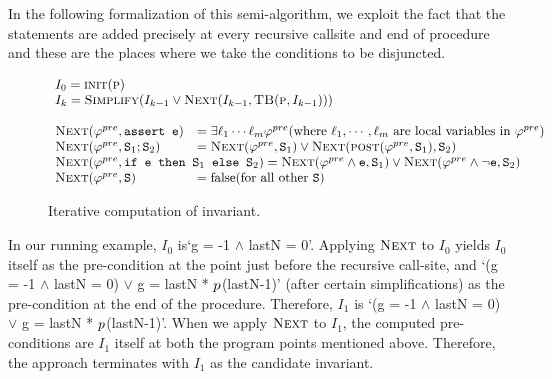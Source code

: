In the following formalization of this semi-algorithm, we exploit the fact that the 
statements are added precisely at every recursive callsite and end of procedure and
these are the places where we take the conditions to be disjuncted.
\begin{figure}
\[
\begin{array}{ll}
\multicolumn{2}{l}{I_0 = \initstatefn(\proc)} \\
\multicolumn{2}{l}{I_{k} = \simplifyfn(I_{k-1} \vee \nextfn(I_{k-1}, \tbody(\proc,I_{k-1})))} \\
\\
\nextfn(\pre, \code{assert e}) &= \exists \ell_1 \cdots \ell_m \pre (\text{where $\ell_1, \cdots, \ell_m$ are local variables in $\pre$})\\
\nextfn(\pre, \stmtSA ; \stmtSB) &= \nextfn(\pre, \stmtSA) \vee \nextfn( \postfn(\pre, \stmtSA), \stmtSB) \\
\multicolumn{2}{l}{
\nextfn(\pre, \code{if \expr{} then \stmtSA{} else \stmtSB{}}) = \nextfn(\pre \wedge \expr, \stmtSA) \vee \nextfn(\pre \wedge \neg \expr, \stmtSB)
} \\
\nextfn(\pre, \stmt) &= \text{false} (\text{for all other \stmt})
\end{array}
\]
\caption{Iterative computation of invariant.}
\label{fig:invgen}
\end{figure}

In our running example, $I_0$  is`g = -1 $\wedge$ lastN = 0'.
Applying $\textsc{Next}$ to $I_0$
yields $I_0$ itself as the pre-condition at the
point just before the recursive call-site, and `(g = -1 $\wedge$ lastN = 0) $\vee$ g = lastN *
$p$(lastN-1)' (after certain simplifications) as the pre-condition
at the end of the
procedure. Therefore, $I_1$ is `(g = -1 $\wedge$ lastN = 0) $\vee$ g = lastN *
$p$(lastN-1)'. When we apply $\textsc{Next}$ to $I_1$,
the computed pre-conditions are $I_1$ itself at both the program points
mentioned above. Therefore, the approach terminates with $I_1$ as the
candidate invariant.

